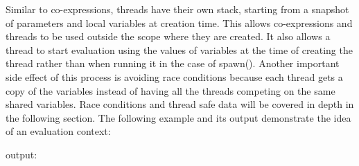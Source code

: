 Similar to co-expressions, threads have their own stack, starting from a
snapshot of parameters and local variables at creation time. This
allows co-expressions and threads to be used outside the scope where
they are created. It also allows a thread to start evaluation using the
values of variables at the time of creating the thread rather than when
running it in the case of \textsf{spawn()}. Another
important side effect of this process is avoiding race conditions
because each thread gets a copy of the variables instead of having all
the threads competing on the same shared variables. Race conditions and
thread safe data will be covered in depth in the following section. The
following example and its output demonstrate the idea of an evaluation
context:


output:


